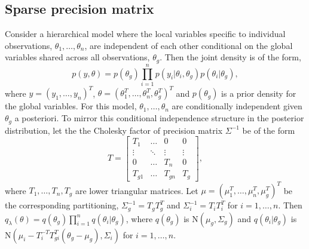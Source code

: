 \documentclass{statsoc}
\newcommand\N{{\text{N}}}
\begin{document}
\subsection{Sparse precision matrix} \label{sec_sparse precision matrix}
Consider a hierarchical model where the local variables specific to individual observations, $\theta_1, \dots, \theta_n$, are independent of each other conditional on the global variables shared across all observations, $\theta_g$. Then the joint density is of the form,
\[
p(y,\theta) = p(\theta_g) \prod_{i=1}^n p(y_i|\theta_i, \theta_g) p(\theta_i|\theta_g),
\]
where $y=(y_1, \dots, y_n)^T$, $\theta = (\theta_1^T , \dots, \theta_n^T , \theta_g^T )^T $ and $p(\theta_g)$ is a prior density for the global variables. For this model, $\theta_1, \dots, \theta_n$ are conditionally independent given $\theta_g$ a posteriori. To mirror this conditional independence structure in the posterior distribution, let the the Cholesky factor of precision matrix $\Sigma^{-1}$ be of the form
\begin{equation} \label{sparse T}
T = \begin{bmatrix}
T_{1}  & \dots & 0 & 0\\
\vdots & \ddots & \vdots & \vdots \\
0  & \dots & T_{n} &0 \\
T_{g1} & \dots & T_{gn} & T_{g}
\end{bmatrix},
\end{equation}
where $T_1, \dots, T_n, T_g$ are lower triangular matrices. Let $\mu = (\mu_1^T , \dots, \mu_n^T , \mu_g^T )^T $ be the corresponding partitioning, $\Sigma_g^{-1} = T_g T_g^T$ and $\Sigma_i^{-1} = T_i T_i^T$ for $i=1, \dots, n$. Then $q_\lambda (\theta) = q(\theta_g) \prod_{i=1}^n q(\theta_i|\theta_g)$, where $q(\theta_g)$ is $\N(\mu_g, \Sigma_g)$ and $q(\theta_i|\theta_g)$ is $\N(\mu_i - T_i^{-T} T_{gi}^T (\theta_g - \mu_g), \Sigma_i)$ for $i=1, \dots, n$. 
\end{document}
